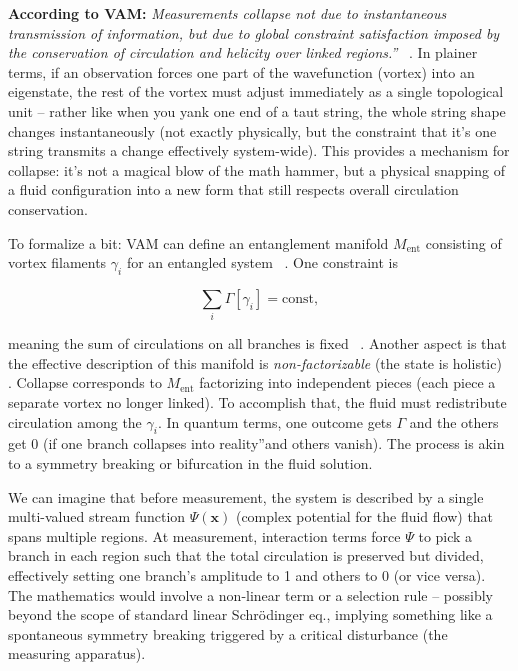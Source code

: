 \documentclass[a4paper, aps,preprint,superscriptaddress, 12pt]{revtex4}
\begin{document}
\textbf{According to VAM:} \textit{\grqq Measurements collapse not due to instantaneous transmission of information, but due to global constraint satisfaction imposed by the conservation of circulation and helicity over linked regions.\textquotedblright}~\cite{Iskandarani2025c} . In plainer terms, if an observation forces one part of the wavefunction (vortex) into an eigenstate, the rest of the vortex must adjust immediately as a single topological unit – rather like when you yank one end of a taut string, the whole string shape changes instantaneously (not exactly physically, but the constraint that it's one string transmits a change effectively system-wide). This provides a mechanism for collapse: it's not a magical blow of the math hammer, but a physical snapping of a fluid configuration into a new form that still respects overall circulation conservation.


To formalize a bit: VAM can define an entanglement manifold $M_{\text{ent}}$ consisting of vortex filaments ${\gamma_i}$ for an entangled system~\cite{Iskandarani2025c} . One constraint is

\begin{equation}
    \sum_i \Gamma[\gamma_i] = \text{const},
\end{equation}

meaning the sum of circulations on all branches is fixed~\cite{Iskandarani2025c} . Another aspect is that the effective description of this manifold is \textit{non-factorizable} (the state is holistic)~\cite{Iskandarani2025c} . Collapse corresponds to $M_{\text{ent}}$ factorizing into independent pieces (each piece a separate vortex no longer linked). To accomplish that, the fluid must redistribute circulation among the $\gamma_i$. In quantum terms, one outcome gets $\Gamma$ and the others get 0 (if one branch \grqq collapses into reality\textquotedblright and others vanish). The process is akin to a symmetry breaking or bifurcation in the fluid solution.


We can imagine that before measurement, the system is described by a single multi-valued stream function $\Psi(\mathbf{x})$ (complex potential for the fluid flow) that spans multiple regions. At measurement, interaction terms force $\Psi$ to pick a branch in each region such that the total circulation is preserved but divided, effectively setting one branch's amplitude to 1 and others to 0 (or vice versa). The mathematics would involve a non-linear term or a selection rule – possibly beyond the scope of standard linear Schrödinger eq., implying something like a spontaneous symmetry breaking triggered by a critical disturbance (the measuring apparatus).
\end{document}
